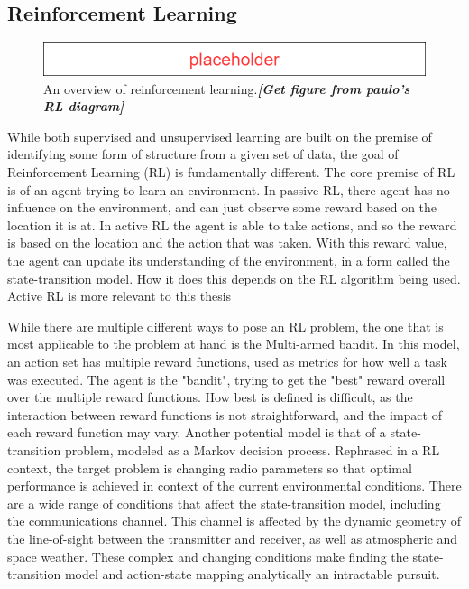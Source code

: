 	\subsection{Reinforcement Learning}

	\begin{figure}
		\centering
		\caption{An overview of reinforcement learning.\textit{\textbf{[Get figure from paulo's RL diagram]}}}\label{bg:flowRL}
		\includegraphics[scale=0.5]{figures/Placeholder.png}
	\end{figure}

	\par While both supervised and unsupervised learning are built on the premise of identifying some form of structure from a given set of data, the goal of Reinforcement Learning (RL) is fundamentally different. The core premise of RL is of an agent trying to learn an environment. In passive RL, there agent has no influence on the environment, and can just observe some reward based on the location it is at. In active RL the agent is able to take actions, and so the reward is based on the location and the action that was taken. With this reward value, the agent can update its understanding of the environment, in a form called the state-transition model. How it does this depends on the RL algorithm being used. Active RL is more relevant to this thesis
	\par While there are multiple different ways to pose an RL problem, the one that is most applicable to the problem at hand is the Multi-armed bandit. In this model, an action set has multiple reward functions, used as metrics for how well a task was executed. 
	The agent is the "bandit", trying to get the "best" reward overall over the multiple reward functions. How best is defined is difficult, as the interaction between reward functions is not straightforward, and the impact of each reward function may vary. 
	 Another potential model is that of a state-transition problem, modeled as a Markov decision process. Rephrased in a RL context, the target problem is changing radio parameters so that optimal performance is achieved in context of the current environmental conditions. There are a wide range of conditions that affect the state-transition model, including the communications channel. This channel is affected by the dynamic geometry of the line-of-sight between the transmitter and receiver, as well as atmospheric and space weather. These complex and changing conditions make finding the state-transition model and action-state mapping analytically an intractable pursuit. 
